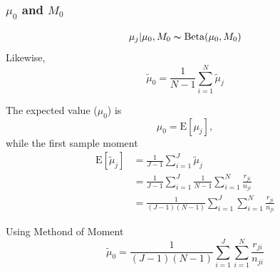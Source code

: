 \documentclass[11pt,reqno]{amsart}
\begin{document}
\subsubsection{$\mu_0$ and $M_0$}
\begin{align}
 \mu_j|\mu_0,M_0\thicksim \text{Beta}(\mu_0,M_0)
\end{align}
Likewise,
\begin{equation}
 \tilde{\mu}_0 =\frac{1}{N-1}\sum_{i=1}^N\tilde{\mu}_j
\end{equation}

The expected value ($\mu_0$) is
\begin{equation}
 \mu_0=\text{E}[\mu_j],
\end{equation}
while the first sample moment
\begin{equation}
\begin{split}
\text{E}[\tilde{\mu}_j] &= \frac{1}{J-1}\sum_{i=1}^J\tilde{\mu}_j\\ &=  \frac{1}{J-1}\sum_{i=1}^J\frac{1}{N-1}\sum_{i=1}^N\frac{r_{ji}}{n_{ji}}\\ &=\frac{1}{(J-1)(N-1)}\sum_{i=1}^J\sum_{i=1}^N\frac{r_{ji}}{n_{ji}}
\end{split}
\end{equation}

Using Methond of Moment
\begin{equation}
  \tilde{\mu}_0 = \frac{1}{(J-1)(N-1)}\sum_{i=1}^J\sum_{i=1}^N\frac{r_{ji}}{n_{ji}}
\end{equation}
\end{document}
